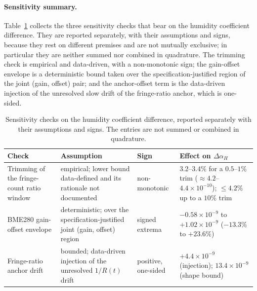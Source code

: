 \documentclass[aps,prapplied,reprint,superscriptaddress]{revtex4-2}
\begin{document}
\paragraph{Sensitivity summary.} Table~\ref{tab:S1d} collects the three sensitivity checks that bear on the humidity coefficient difference. They are reported separately, with their assumptions and signs, because they rest on different premises and are not mutually exclusive; in particular they are neither summed nor combined in quadrature. The trimming check is empirical and data-driven, with a non-monotonic sign; the gain-offset envelope is a deterministic bound taken over the specification-justified region of the joint (gain, offset) pair; and the anchor-offset term is the data-driven injection of the unresolved slow drift of the fringe-ratio anchor, which is one-sided.

\begin{table}[htbp]
\centering
\caption{Sensitivity checks on the humidity coefficient difference, reported separately with their assumptions and signs. The entries are not summed or combined in quadrature.}
\label{tab:S1d}
\begin{tabular}{p{}p{}p{}p{}}
\hline
Check & Assumption & Sign & Effect on $\Delta\alpha_H$ \\
\hline
Trimming of the fringe-count ratio window & empirical; lower bound data-defined and its rationale not documented & non-monotonic & $3.2$--$3.4\%$ for a $0.5$--$1\%$ trim ($\approx 4.2$--$4.4\times10^{-10}$); $\le 4.2\%$ up to a $10\%$ trim \\
BME280 gain-offset envelope & deterministic; over the specification-justified joint (gain, offset) region & signed extrema & $-0.58\times10^{-9}$ to $+1.02\times10^{-9}$ ($-13.3\%$ to $+23.6\%$) \\
Fringe-ratio anchor drift & bounded; data-driven injection of the unresolved $1/R(t)$ drift & positive, one-sided & $+4.4\times10^{-9}$ (injection); $13.4\times10^{-9}$ (shape bound) \\
\hline
\end{tabular}
\end{table}
\end{document}
